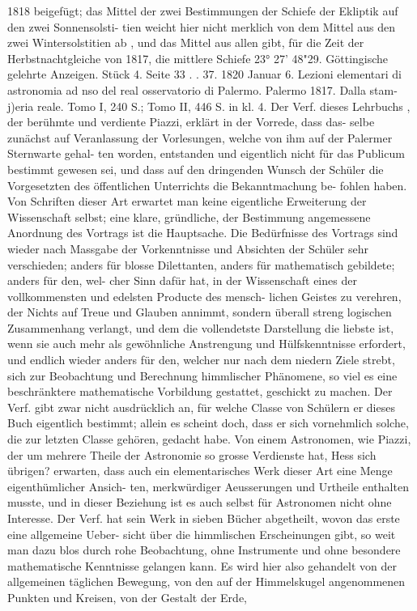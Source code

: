 \documentclass[12pt,a4paper]{article}
\begin{document}
{{{{{{{{1818  beigefügt;  das  Mittel  der  zwei  Bestimmungen  der  Schiefe  der  Ekliptik  auf  den  zwei  Sonnensolsti- tien  weicht  hier  nicht  merklich  von  dem  Mittel  aus  den  zwei  Wintersolstitien  ab ,  und  das  Mittel  aus allen  gibt,  für  die  Zeit  der  Herbstnachtgleiche  von  1817,  die  mittlere  Schiefe   23°  27'  48"29. Göttingische  gelehrte  Anzeigen.     Stück  4.     Seite  33 . .  37.     1820  Januar  6. Lezioni  elementari  di  astronomia  ad  nso  del  real  osservatorio  di  Palermo.     Palermo  1817.  Dalla  stam- j)eria  reale.     Tomo  I,  240  S.;  Tomo  II,  446  S.  in  kl.  4. Der  Verf.  dieses  Lehrbuchs ,  der  berühmte  und  verdiente  Piazzi,  erklärt  in  der  Vorrede,  dass  das- selbe zunächst  auf  Veranlassung  der  Vorlesungen,   welche  von  ihm   auf  der  Palermer  Sternwarte  gehal- ten worden,  entstanden  und  eigentlich  nicht  für  das  Publicum  bestimmt  gewesen  sei,  und  dass  auf  den dringenden  Wunsch  der  Schüler  die  Vorgesetzten  des   öffentlichen  Unterrichts  die  Bekanntmachung  be- fohlen haben.      Von  Schriften    dieser  Art  erwartet  man  keine  eigentliche  Erweiterung  der  Wissenschaft selbst;  eine  klare,  gründliche,  der  Bestimmung  angemessene  Anordnung  des  Vortrags  ist  die  Hauptsache. Die  Bedürfnisse  des  Vortrags  sind  wieder  nach  Massgabe  der  Vorkenntnisse   und  Absichten  der   Schüler sehr  verschieden;  anders  für  blosse  Dilettanten,  anders  für  mathematisch  gebildete;  anders  für  den,  wel- cher Sinn  dafür  hat,  in  der  Wissenschaft  eines  der  vollkommensten  und  edelsten  Producte  des  mensch- lichen Geistes  zu  verehren,  der  Nichts  auf  Treue  und  Glauben  annimmt,  sondern  überall  streng  logischen Zusammenhang  verlangt,  und  dem  die  vollendetste  Darstellung  die  liebste  ist,   wenn  sie  auch  mehr  als gewöhnliche  Anstrengung  und  Hülfskenntnisse  erfordert,  und  endlich  wieder  anders  für  den,  welcher  nur nach  dem  niedern  Ziele  strebt,  sich  zur  Beobachtung  und  Berechnung  himmlischer  Phänomene,   so  viel es  eine  beschränktere  mathematische  Vorbildung  gestattet,  geschickt  zu  machen.     Der  Verf.   gibt  zwar nicht  ausdrücklich  an,    für  welche  Classe    von  Schülern   er  dieses   Buch  eigentlich  bestimmt;    allein  es scheint  doch,  dass  er  sich  vornehmlich  solche,  die  zur  letzten  Classe  gehören,  gedacht  habe.    Von  einem Astronomen,  wie  Piazzi,  der  um  mehrere  Theile  der  Astronomie    so   grosse  Verdienste   hat,   Hess  sich übrigen?  erwarten,  dass  auch  ein  elementarisches  Werk  dieser  Art  eine  Menge  eigenthümlicher  Ansich- ten, merkwürdiger  Aeusserungen  und  Urtheile  enthalten  musste,    und   in    dieser  Beziehung  ist  es  auch selbst  für  Astronomen  nicht  ohne  Interesse. Der  Verf.  hat  sein  Werk  in  sieben  Bücher  abgetheilt,  wovon  das  erste  eine  allgemeine  Ueber- sicht  über  die  himmlischen  Erscheinungen  gibt,  so  weit  man  dazu  blos  durch  rohe  Beobachtung,  ohne Instrumente  und  ohne  besondere  mathematische  Kenntnisse  gelangen  kann.  Es  wird  hier  also  gehandelt von  der  allgemeinen  täglichen  Bewegung,  von  den  auf  der  Himmelskugel  angenommenen  Punkten  und Kreisen,  von  der  Gestalt  der  Erde,  }}}}}}}}
\end{document}

